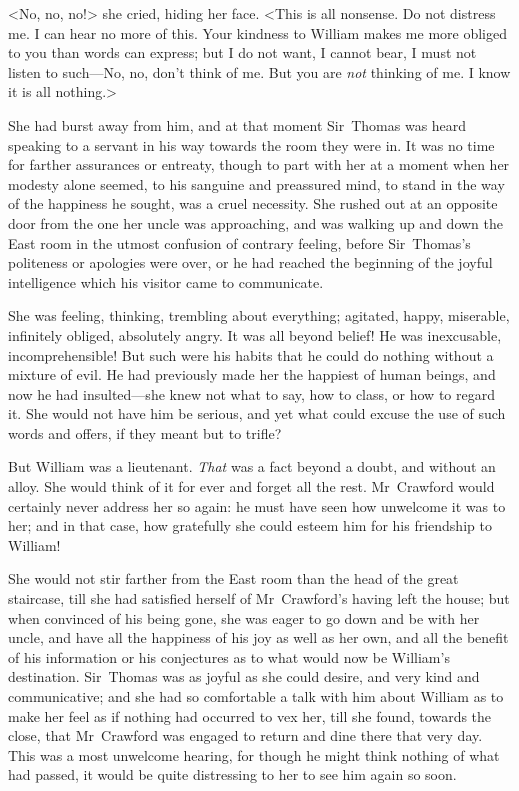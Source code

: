 <No, no, no!> she cried, hiding her face. <This is all nonsense. Do not distress me. I can hear no more of this. Your kindness to William makes me more obliged to you than words can express; but I do not want, I cannot bear, I must not listen to such—No, no, don't think of me. But you are \textit{not}  thinking of me. I know it is all nothing.>

She had burst away from him, and at that moment Sir~Thomas was heard speaking to a servant in his way towards the room they were in. It was no time for farther assurances or entreaty, though to part with her at a moment when her modesty alone seemed, to his sanguine and preassured mind, to stand in the way of the happiness he sought, was a cruel necessity. She rushed out at an opposite door from the one her uncle was approaching, and was walking up and down the East room in the utmost confusion of contrary feeling, before Sir~Thomas's politeness or apologies were over, or he had reached the beginning of the joyful intelligence which his visitor came to communicate.

She was feeling, thinking, trembling about everything; agitated, happy, miserable, infinitely obliged, absolutely angry. It was all beyond belief! He was inexcusable, incomprehensible! But such were his habits that he could do nothing without a mixture of evil. He had previously made her the happiest of human beings, and now he had insulted—she knew not what to say, how to class, or how to regard it. She would not have him be serious, and yet what could excuse the use of such words and offers, if they meant but to trifle?

But William was a lieutenant. \textit{That}  was a fact beyond a doubt, and without an alloy. She would think of it for ever and forget all the rest. Mr~Crawford would certainly never address her so again: he must have seen how unwelcome it was to her; and in that case, how gratefully she could esteem him for his friendship to William!

She would not stir farther from the East room than the head of the great staircase, till she had satisfied herself of Mr~Crawford's having left the house; but when convinced of his being gone, she was eager to go down and be with her uncle, and have all the happiness of his joy as well as her own, and all the benefit of his information or his conjectures as to what would now be William's destination. Sir~Thomas was as joyful as she could desire, and very kind and communicative; and she had so comfortable a talk with him about William as to make her feel as if nothing had occurred to vex her, till she found, towards the close, that Mr~Crawford was engaged to return and dine there that very day. This was a most unwelcome hearing, for though he might think nothing of what had passed, it would be quite distressing to her to see him again so soon.

